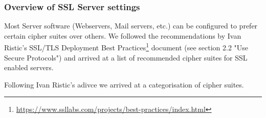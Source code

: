 %

\subsubsection{Overview of SSL Server settings}


Most Server software (Webservers, Mail servers, etc.) can be configured to prefer certain cipher suites over others. 
We followed the recommendations by Ivan Ristic's SSL/TLS Deployment Best Practices\footnote{\url{https://www.ssllabs.com/projects/best-practices/index.html}} document (see section 2.2 "Use Secure Protocols") and arrived at a list of recommended cipher suites for SSL enabled servers.

Following Ivan Ristic's adivce we arrived at a categorisation of cipher suites.

